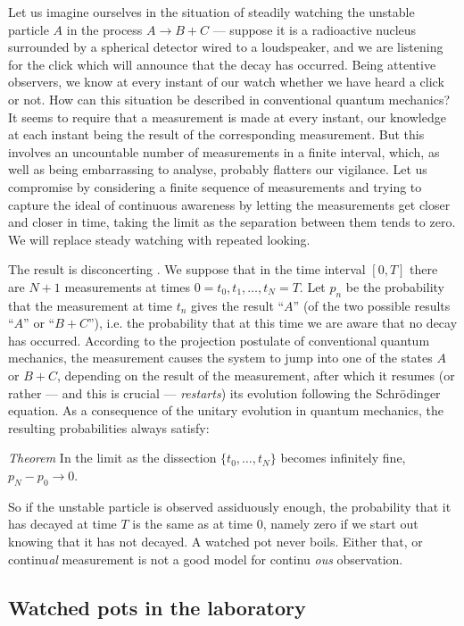 \documentclass[12pt,a4paper,reqno]{article}
\renewcommand{\(}{\left(}
\renewcommand{\)}{\right)}
\newcommand{\<}{\langle}
\renewcommand{\>}{\rangle}
\theoremstyle{plain} %
\theoremstyle{definition}
\theoremstyle{remark}
\begin{document}
Let us imagine ourselves in the situation of steadily watching the unstable 
particle $A$ in the process $A \rightarrow B+C$ --- suppose it is a radioactive 
nucleus surrounded by a spherical detector wired to a loudspeaker, and 
we are listening for the click which will announce that the decay has 
occurred. Being attentive observers, we know at every instant of our watch 
whether we have heard a click or not. How can this situation be described 
in conventional quantum mechanics? It seems to require that a measurement 
is made at every instant, our knowledge at each instant being the result 
of the corresponding measurement. But this involves an uncountable number 
of measurements in a finite interval, which, as well as being embarrassing 
to analyse, probably flatters our vigilance. Let us compromise by considering 
a finite sequence of measurements and trying to capture the ideal of continuous 
awareness by letting the measurements get closer and closer in time, taking 
the limit as the separation between them tends to zero. We will replace 
steady watching with repeated looking.

The result is disconcerting \cite{Yourgrau, MisraSuda, obsdecay}. We suppose that in the 
time interval $[0,T]$ there are $N+1$ measurements at times $0=t_0, t_1, 
\ldots, t_N=T$.  Let $p_n$ be the probability that the measurement at time 
$t_n$ gives the result ``$A$'' (of the two possible results ``$A$'' or 
``$B+C$''), i.e. the probability that at this time we are aware that 
no decay has occurred. According to the projection postulate of conventional 
quantum mechanics, the measurement causes the system to jump into one 
of the states $A$ or $B+C$, depending on the result of the measurement, 
after which it resumes (or rather --- and this is crucial --- {\em restarts}) 
its evolution following the Schr\"odinger equation. As a consequence of the 
unitary evolution in quantum mechanics, the resulting probabilities
always satisfy:

{\em Theorem} \cite{MisraSuda, obsdecay} In the limit as the dissection
$\{t_0, \ldots , t_N\}$ becomes infinitely fine, $p_N - p_0 \rightarrow 0$.

So if the unstable particle is observed assiduously enough, the probability 
that it has decayed at time $T$ is the same as at time $0$, namely zero 
if we start out knowing that it has not decayed. A watched pot never boils. 
Either that, or continu{\em al} measurement is not a good model for continu{\em 
ous} observation.

\subsection{Watched pots in the laboratory}
\end{document}
